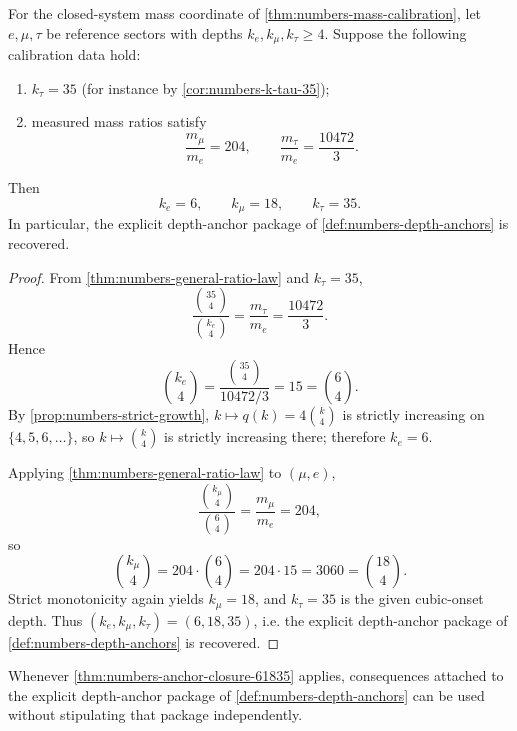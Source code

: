 \begin{theorem}
\label{thm:numbers-anchor-closure-61835}
For the closed-system mass coordinate of \cref{thm:numbers-mass-calibration}, let
\(e,\mu,\tau\) be reference sectors with depths
\(k_e,k_\mu,k_\tau\ge4\).
Suppose the following calibration data hold:
\begin{enumerate}[label=\textup{(\roman*)}]
\item
      \(k_\tau=35\) (for instance by \cref{cor:numbers-k-tau-35});
\item
      measured mass ratios satisfy
      \[
        \frac{m_\mu}{m_e}=204,
        \qquad
        \frac{m_\tau}{m_e}=\frac{10472}{3}.
      \]
\end{enumerate}
Then
\[
  k_e=6,
  \qquad
  k_\mu=18,
  \qquad
  k_\tau=35.
\]
In particular, the explicit depth-anchor package of
\cref{def:numbers-depth-anchors} is recovered.
\end{theorem}

\begin{proof}
From \cref{thm:numbers-general-ratio-law} and \(k_\tau=35\),
\[
  \frac{\binom{35}{4}}{\binom{k_e}{4}}
  =
  \frac{m_\tau}{m_e}
  =
  \frac{10472}{3}.
\]
Hence
\[
  \binom{k_e}{4}
  =
  \frac{\binom{35}{4}}{10472/3}
  =
  15
  =
  \binom{6}{4}.
\]
By \cref{prop:numbers-strict-growth},
\(k\mapsto q(k)=4\binom{k}{4}\) is strictly increasing on
\(\{4,5,6,\dots\}\), so \(k\mapsto\binom{k}{4}\) is strictly increasing
there; therefore \(k_e=6\).

Applying \cref{thm:numbers-general-ratio-law} to \((\mu,e)\),
\[
  \frac{\binom{k_\mu}{4}}{\binom{6}{4}}
  =
  \frac{m_\mu}{m_e}
  =
  204,
\]
so
\[
  \binom{k_\mu}{4}=204\cdot\binom{6}{4}=204\cdot15=3060=\binom{18}{4}.
\]
Strict monotonicity again yields \(k_\mu=18\), and \(k_\tau=35\) is the
given cubic-onset depth.
Thus \((k_e,k_\mu,k_\tau)=(6,18,35)\), i.e. the explicit
depth-anchor package of \cref{def:numbers-depth-anchors} is recovered.
\end{proof}

\begin{corollary}
\label{cor:numbers-anchor-closure-discharges}
Whenever \cref{thm:numbers-anchor-closure-61835} applies, consequences attached to the explicit depth-anchor package
of \cref{def:numbers-depth-anchors} can be used without stipulating that
package independently.
\end{corollary}

